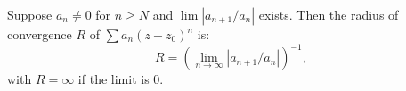 Suppose $a_n \neq 0$ for $n \geq N$ and $\lim |a_{n+1}/a_n|$ exists. Then the radius of convergence $R$ of $\sum a_n (z - z_0)^n$ is:
\[
R = \left(\lim_{n \to \infty} |a_{n+1}/a_n|\right)^{-1},
\]
with $R = \infty$ if the limit is $0$.
